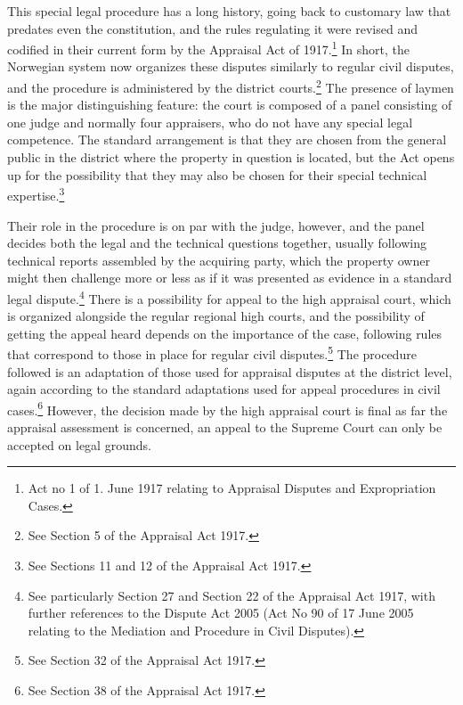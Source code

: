 This special legal procedure has a long history, going back to customary law that predates even the constitution, and the rules regulating it were revised and codified in their current form by the Appraisal Act of 1917.\footnote{Act no 1 of 1. June 1917 relating to Appraisal Disputes and Expropriation Cases.} In short, the Norwegian system now organizes these disputes similarly to regular civil disputes, and the procedure is administered by the district courts.\footnote{See Section 5 of the Appraisal Act 1917.} The presence of laymen is the major distinguishing feature: the court is composed of a panel consisting of one judge and normally four appraisers, who do not have any special legal competence. The standard arrangement is that they are chosen from the general public in the district where the property in question is located, but the Act opens up for the possibility that they may also be chosen for their special technical expertise.\footnote{See Sections 11 and 12 of the Appraisal Act 1917.}

Their role in the procedure is on par with the judge, however, and the panel decides both the legal and the technical questions together, usually following technical reports assembled by the acquiring party, which the property owner might then challenge more or less as if it was presented as evidence in a standard legal dispute.\footnote{See particularly Section 27 and Section 22 of the Appraisal Act 1917, with further references to the Dispute Act 2005 (Act No 90 of 17 June 2005 relating to the Mediation and Procedure in Civil Disputes).}
There is a possibility for appeal to the high appraisal court, which is organized alongside the regular regional high courts, and the possibility of getting the appeal heard depends on the importance of the case, following rules that correspond to those in place for regular civil disputes.\footnote{See Section 32 of the Appraisal Act 1917.} The procedure followed is an adaptation of those used for appraisal disputes at the district level, again according to the standard adaptations used for appeal procedures in civil cases.\footnote{See Section 38 of the Appraisal Act 1917.} However, the decision made by the high appraisal court is final as far the appraisal assessment is concerned, an appeal to the Supreme Court can only be accepted on legal grounds.

